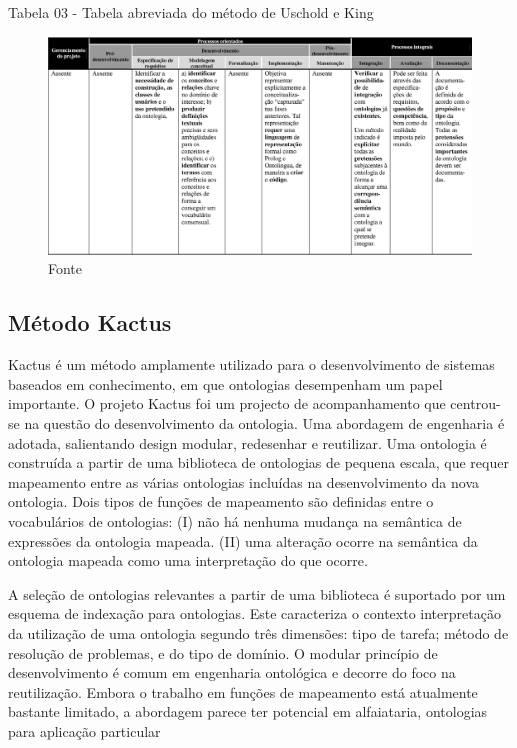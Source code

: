 \pagebreak
Tabela 03 - Tabela abreviada do método de Uschold e King

\begin{figure}[h] 
\centering %
\includegraphics[scale=0.3]{Figuras/6.png} %
\caption{Fonte%
}
\end{figure}

\subsection{Método Kactus} 
\qquad Kactus é um método amplamente utilizado para o desenvolvimento de sistemas baseados em conhecimento, em que ontologias desempenham um papel importante. O projeto Kactus foi um projecto de acompanhamento que centrou-se na questão do desenvolvimento da ontologia. Uma abordagem de engenharia é adotada, salientando design modular, redesenhar e reutilizar. Uma ontologia é construída a partir de uma biblioteca de ontologias de pequena escala, que requer mapeamento entre as várias ontologias incluídas na desenvolvimento da nova ontologia. Dois tipos de funções de mapeamento são definidas entre o vocabulários de ontologias:
(I) não há nenhuma mudança na semântica de expressões da ontologia mapeada.
(II) uma alteração ocorre na semântica da ontologia mapeada como uma interpretação do que ocorre.

A seleção de ontologias relevantes a partir de uma biblioteca é suportado por um esquema de indexação para ontologias. Este caracteriza o contexto interpretação da utilização de uma ontologia segundo três dimensões: tipo de tarefa; método de resolução de problemas, e do tipo de domínio. O modular princípio de desenvolvimento é comum em engenharia ontológica e decorre do foco na reutilização. Embora o trabalho em funções de mapeamento está atualmente bastante limitado, a abordagem parece ter potencial em alfaiataria, ontologias para aplicação particular %

